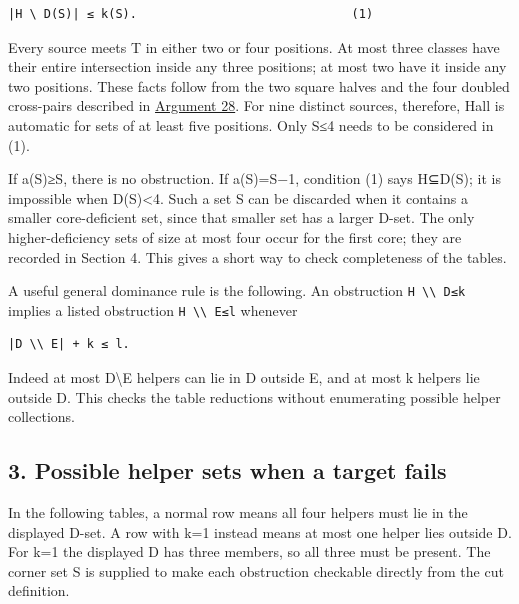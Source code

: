 \documentclass[
  10pt,
]{article}
\begin{document}
\begin{verbatim}
|H \ D(S)| ≤ k(S).                              (1)
\end{verbatim}

Every source meets T in either two or four positions. At most three
classes have their entire intersection inside any three positions; at
most two have it inside any two positions. These facts follow from the
two square halves and the four doubled cross-pairs described in
\protect\hyperlink{arg-28}{Argument 28}. For nine distinct sources,
therefore, Hall is automatic for sets of at least five positions. Only
\textbar S\textbar≤4 needs to be considered in (1).

If a(S)≥\textbar S\textbar, there is no obstruction. If
a(S)=\textbar S\textbar−1, condition (1) says H⊆D(S); it is impossible
when \textbar D(S)\textbar\textless4. Such a set S can be discarded when
it contains a smaller core-deficient set, since that smaller set has a
larger D-set. The only higher-deficiency sets of size at most four occur
for the first core; they are recorded in Section 4. This gives a short
way to check completeness of the tables.

A useful general dominance rule is the following. An obstruction
\texttt{\textbar{}H\ \textbackslash{}\textbackslash{}\ D\textbar{}≤k}
implies a listed obstruction
\texttt{\textbar{}H\ \textbackslash{}\textbackslash{}\ E\textbar{}≤l}
whenever

\begin{verbatim}
|D \\ E| + k ≤ l.
\end{verbatim}

Indeed at most \textbar D\textbackslash E\textbar{} helpers can lie in D
outside E, and at most k helpers lie outside D. This checks the table
reductions without enumerating possible helper collections.

\hypertarget{possible-helper-sets-when-a-target-fails}{%
\subsection*{3. Possible helper sets when a target
fails}\label{possible-helper-sets-when-a-target-fails}}

In the following tables, a normal row means all four helpers must lie in
the displayed D-set. A row with k=1 instead means at most one helper
lies outside D. For k=1 the displayed D has three members, so all three
must be present. The corner set S is supplied to make each obstruction
checkable directly from the cut definition.
\end{document}
